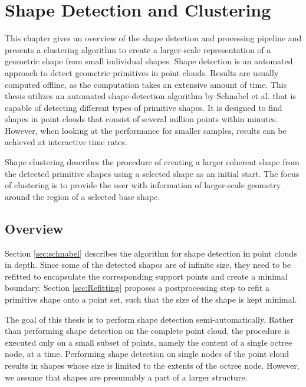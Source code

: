 \chapter{Shape Detection and Clustering}
\label{chap:shapeDetection}

This chapter gives an overview of the shape detection and processing pipeline and presents a clustering algorithm to create a larger-scale representation of a geometric shape from small individual shapes. 
Shape detection is an automated approach to detect geometric primitives in point clouds. Results are usually computed offline, as the computation takes an extensive amount of time. This thesis utilizes an automated shape-detection algorithm by Schnabel et al. \cite{schnabel-2007-efficient} that is capable of detecting different types of primitive shapes. It is designed to find shapes in point clouds that consist of several million points within minutes. However, when looking at the performance for smaller samples, results can be achieved at interactive time rates. 

\par

Shape clustering describes the procedure of creating a larger coherent shape from the detected primitive shapes using a selected shape as an initial start. The focus of clustering is to provide the user with information of larger-scale geometry around the region of a selected base shape. 


\section{Overview}

Section \ref{sec:schnabel} describes the algorithm for shape detection in point clouds in depth. Since some of the detected shapes are of infinite size, they need to be refitted to encapsulate the corresponding support points and create a minimal boundary. Section \ref{sec:Refitting} proposes a postprocessing step to refit a primitive shape onto a point set, such that the size of the shape is kept minimal. 

\par

The goal of this thesis is to perform shape detection semi-automatically. Rather than performing shape detection on the complete point cloud, the procedure is executed only on a small subset of points, namely the content of a single octree node, at a time. Performing shape detection on single nodes of the point cloud results in shapes whose size is limited to the extents of the octree node. However, we assume that shapes are presumably a part of a larger structure. 

